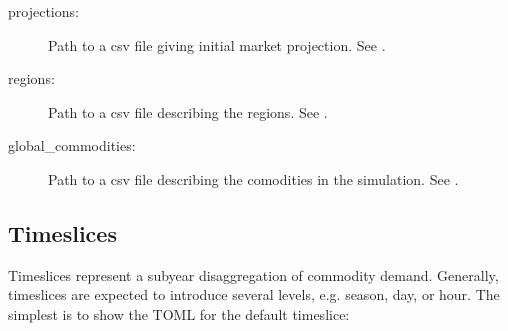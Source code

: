 \documentclass[letterpaper,10pt,english]{sphinxmanual}
\begin{document}
\begin{sphinxVerbatim}[commandchars=\\\{\}]
  
  
  
\end{sphinxVerbatim}
\begin{description}
\item[{projections:}] \leavevmode
Path to a csv file giving initial market projection. See {\hyperref[\detokenize{inputs/projections:inputs-projection}]{}}.

\item[{regions:}] \leavevmode
Path to a csv file describing the regions. See
{\hyperref[\detokenize{inputs/regions:regional-data}]{}}.

\item[{global\_commodities:}] \leavevmode
Path to a csv file describing the comodities in the simulation. See
{\hyperref[\detokenize{inputs/commodities:inputs-commodities}]{}}.

\end{description}


\subsection{Timeslices}
\label{\detokenize{inputs/toml:timeslices}}\label{\detokenize{inputs/toml:timeslices-toml}}
Time\sphinxhyphen{}slices represent a sub\sphinxhyphen{}year disaggregation of commodity demand. Generally,
timeslices are expected to introduce several levels, e.g. season, day, or hour. The
simplest is to show the TOML for the default timeslice:
\end{document}
